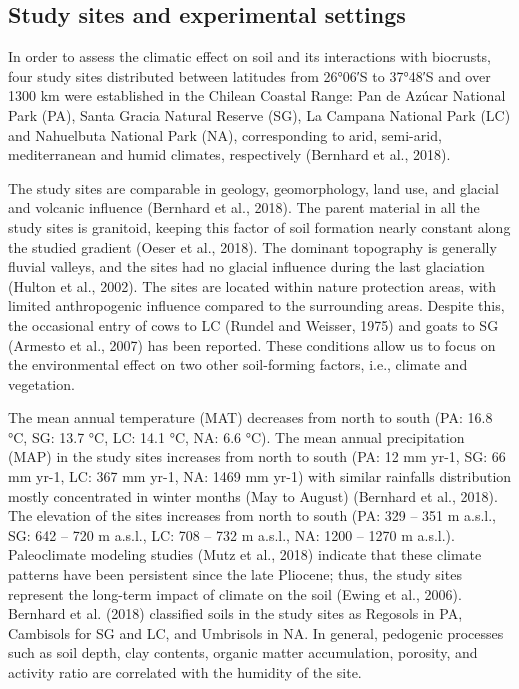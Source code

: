 {\subsection{Study sites and experimental settings}

In order to assess the climatic effect on soil and its interactions with biocrusts, four study sites distributed between latitudes from \ang{26;06}S to \ang{37;48}S and over 1300 km were established in the Chilean Coastal Range: Pan de Azúcar National Park (PA), Santa Gracia Natural Reserve (SG), La Campana National Park (LC) and Nahuelbuta National Park (NA), corresponding to arid, semi-arid, mediterranean and humid climates, respectively (Bernhard et al., 2018).

The study sites are comparable in geology, geomorphology, land use, and glacial and volcanic influence (Bernhard et al., 2018). The parent material in all the study sites is granitoid, keeping this factor of soil formation nearly constant along the studied gradient (Oeser et al., 2018). The dominant topography is generally fluvial valleys, and the sites had no glacial influence during the last glaciation (Hulton et al., 2002). The sites are located within nature protection areas, with limited anthropogenic influence compared to the surrounding areas. Despite this, the occasional entry of cows to LC (Rundel and Weisser, 1975) and goats to SG (Armesto et al., 2007) has been reported. These conditions allow us to focus on the environmental effect on two other soil-forming factors, i.e., climate and vegetation.

The mean annual temperature (MAT) decreases from north to south (PA: 16.8 °C, SG: 13.7 °C, LC: 14.1 °C, NA: 6.6 °C). The mean annual precipitation (MAP) in the study sites increases from north to south (PA: 12 mm yr-1, SG: 66 mm yr-1, LC: 367 mm yr-1, NA: 1469 mm yr-1) with similar rainfalls distribution mostly concentrated in winter months (May to August) (Bernhard et al., 2018). The elevation of the sites increases from north to south (PA: 329 – 351 m a.s.l., SG: 642 – 720 m a.s.l., LC: 708 – 732 m a.s.l., NA: 1200 – 1270 m a.s.l.). Paleoclimate modeling studies (Mutz et al., 2018) indicate that these climate patterns have been persistent since the late Pliocene; thus, the study sites represent the long-term impact of climate on the soil (Ewing et al., 2006). Bernhard et al. (2018) classified soils in the study sites as Regosols in PA, Cambisols for SG and LC, and Umbrisols in NA. In general, pedogenic processes such as soil depth, clay contents, organic matter accumulation, porosity, and activity ratio are correlated with the humidity of the site.

}
